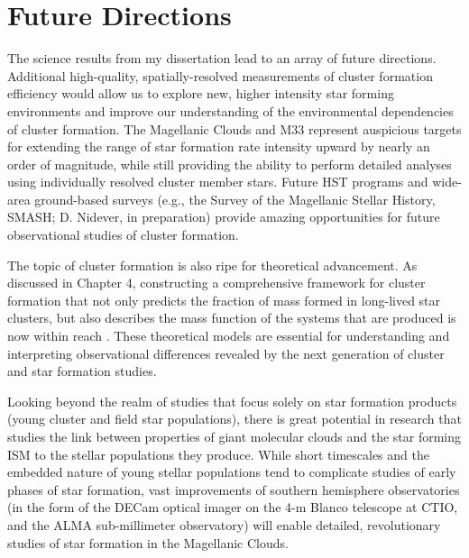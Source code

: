 \section{Future Directions}\label{MPSection:AC060E22-704B-4776-8B0F-08FA113B6533}

The science results from my dissertation lead to an array of future directions. Additional high-quality, spatially-resolved measurements of cluster formation efficiency would allow us to explore new, higher intensity star forming environments and improve our understanding of the environmental dependencies of cluster formation. The Magellanic Clouds and M33 represent auspicious targets for extending the range of star formation rate intensity upward by nearly an order of magnitude, while still providing the ability to perform detailed analyses using individually resolved cluster member stars. Future HST programs and wide-area ground-based surveys (e.g., the Survey of the Magellanic Stellar History, SMASH; D. Nidever, in preparation) provide amazing opportunities for future observational studies of cluster formation.

The topic of cluster formation is also ripe for theoretical advancement. As discussed in Chapter 4, constructing a comprehensive framework for cluster formation that not only predicts the fraction of mass formed in long-lived star clusters, but also describes the mass function of the systems that are produced is now within reach . These theoretical models are essential for understanding and interpreting observational differences revealed by the next generation of cluster and star formation studies.

Looking beyond the realm of studies that focus solely on star formation products (young cluster and field star populations), there is great potential in research that studies the link between properties of giant molecular clouds and the star forming ISM to the stellar populations they produce. While short timescales and the embedded nature of young stellar populations tend to complicate studies of early phases of star formation, vast improvements of southern hemisphere observatories (in the form of the DECam optical imager on the 4-m Blanco telescope at CTIO, and the ALMA sub-millimeter observatory) will enable detailed, revolutionary studies of star formation in the Magellanic Clouds.

